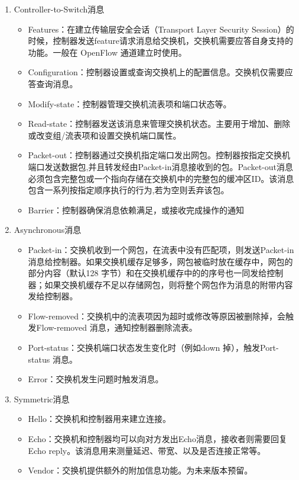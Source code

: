 \begin{enumerate}
\item Controller-to-Switch消息
\begin{itemize}
\item Features：在建立传输层安全会话（Transport Layer Security Session）的时候，控制器发送feature请求消息给交换机，交换机需要应答自身支持的功能。一般在 OpenFlow 通道建立时使用。
\item Configuration：控制器设置或查询交换机上的配置信息。交换机仅需要应答查询消息。
\item Modify-state：控制器管理交换机流表项和端口状态等。
\item Read-state：控制器发送该消息来管理交换机状态。主要用于增加、删除或改变组/流表项和设置交换机端口属性。
\item Packet-out：控制器通过交换机指定端口发出网包。控制器按指定交换机端口发送数据包,并且转发经由Packet-in消息接收到的包。Packet-out消息必须包含完整包或一个指向存储在交换机中的完整包的缓冲区ID。该消息包含一系列按指定顺序执行的行为,若为空则丢弃该包。 
\item Barrier：控制器确保消息依赖满足，或接收完成操作的通知
\end{itemize}
\item Asynchronous消息
\begin{itemize}
\item Packet-in：交换机收到一个网包，在流表中没有匹配项，则发送Packet-in 消息给控制器。如果交换机缓存足够多，网包被临时放在缓存中，网包的部分内容（默认128 字节）和在交换机缓存中的的序号也一同发给控制器；如果交换机缓存不足以存储网包，则将整个网包作为消息的附带内容发给控制器。
\item Flow-removed：交换机中的流表项因为超时或修改等原因被删除掉，会触发Flow-removed 消息，通知控制器删除流表。
\item Port-status：交换机端口状态发生变化时（例如down 掉），触发Port-status 消息。
\item Error：交换机发生问题时触发消息。
\end{itemize}
\item Symmetric消息
\begin{itemize}
\item Hello：交换机和控制器用来建立连接。
\item Echo：交换机和控制器均可以向对方发出Echo消息，接收者则需要回复Echo reply。该消息用来测量延迟、带宽、以及是否连接正常等。
\item Vendor：交换机提供额外的附加信息功能。为未来版本预留。
\end{itemize}
\end{enumerate}


